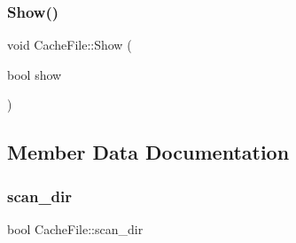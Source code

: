 \hypertarget{class_cache_file_a9ca31ec96700e19dc9ae255b0c2ea777}{}\label{class_cache_file_a9ca31ec96700e19dc9ae255b0c2ea777} 
\subsubsection{\texorpdfstring{Show()}{Show()}}
{\footnotesize\ttfamily void Cache\+File\+::\+Show (\begin{DoxyParamCaption}\item[{bool}]{show }\end{DoxyParamCaption})}



\subsection{Member Data Documentation}
\hypertarget{class_cache_file_a7a3c883612696d6a94787471ede49afc}{}\label{class_cache_file_a7a3c883612696d6a94787471ede49afc} 
\subsubsection{\texorpdfstring{scan\+\_\+dir}{scan\_dir}}
{\footnotesize\ttfamily bool Cache\+File\+::scan\+\_\+dir}

